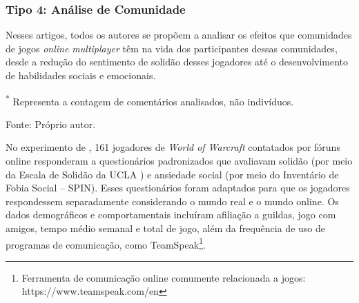 \subsubsection{Tipo 4: Análise de Comunidade}

Nesses artigos, todos os autores se propõem a analisar os efeitos que comunidades de jogos \textit{online multiplayer} têm na vida dos participantes dessas comunidades, desde a redução do sentimento de solidão desses jogadores até o desenvolvimento de habilidades sociais e emocionais.


\begin{table}[H]
\centering
\caption{Estudos sobre comunidades em jogos digitais}
\label{tab:comunidades}
\begin{flushleft}
\footnotesize\textsuperscript{*} Representa a contagem de comentários analisados, não indivíduos.
\end{flushleft}
\par
\vspace{2mm}
\footnotesize Fonte: Próprio autor.
\end{table}

No experimento de , 161 jogadores de \textit{World of Warcraft} contatados por fóruns online responderam a questionários padronizados que avaliavam solidão (por meio da Escala de Solidão da UCLA \cite{russell1996ucla}) e ansiedade social (por meio do Inventário de Fobia Social – SPIN\cite{connor2000spin}).
Esses questionários foram adaptados para que os jogadores respondessem separadamente considerando o mundo real e o mundo online.
Os dados demográficos e comportamentais incluíram afiliação a guildas, jogo com amigos, tempo médio semanal e total de jogo, além da frequência de uso de programas de comunicação, como TeamSpeak\footnote{Ferramenta de comunicação online comumente relacionada a jogos: https://www.teamspeak.com/en}.

